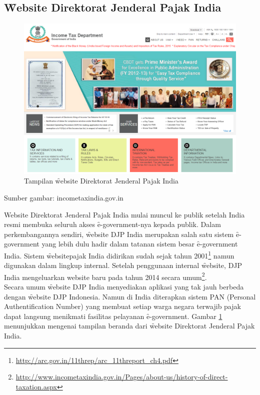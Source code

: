 \subsection{\f{Website} Direktorat Jenderal Pajak India}
\begin{figure}
	\centering
	\includegraphics[width=\textwidth]
	{pics/pajakindiaweb.PNG}
	\caption{Tampilan \f{website} Direktorat Jenderal Pajak India}
	\label{fig:pajakindiaweb}
\end{figure}
\begin{center}
	{\small Sumber gambar: incometaxindia.gov.in}
\end{center}
Website Direktorat Jenderal Pajak India mulai muncul ke publik setelah India resmi membuka seluruh akses \f{e-government}-nya kepada publik. Dalam perkembangannya sendiri, \f{website} DJP India merupakan salah satu sistem \f{e-government} yang lebih dulu hadir dalam tatanan sistem besar \f{e-government} India. Sistem \f{website}pajak India didirikan sudah sejak tahun 2001\footnote{\url{http://arc.gov.in/11threp/arc_11threport_ch4.pdf}} namun digunakan dalam lingkup internal. Setelah penggunaan internal \f{website}, DJP India mengeluarkan website baru pada tahun 2014 secara umum\footnote{\url{http://www.incometaxindia.gov.in/Pages/about-us/history-of-direct-taxation.aspx}}.
\newline\\
Secara umum \f{website} DJP India menyediakan aplikasi yang tak jauh berbeda dengan \f{website} DJP Indonesia. Namun di India diterapkan sistem PAN (Personal Authentification Number) yang membuat setiap warga negara terwajib pajak dapat langsung menikmati fasilitas pelayanan \f{e-government}. Gambar \ref{fig:pajakindiaweb} menunjukkan mengenai tampilan beranda dari \f{website} Direktorat Jenderal Pajak India.
